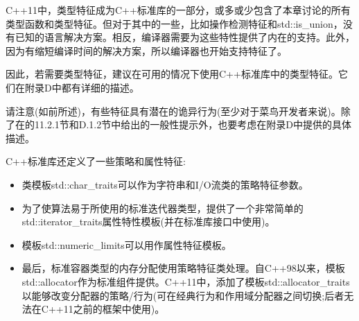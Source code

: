 C++11中，类型特征成为C++标准库的一部分，或多或少包含了本章讨论的所有类型函数和类型特征。但对于其中的一些，比如操作检测特征和std::is\_union，没有已知的语言解决方案。相反，编译器需要为这些特性提供了内在的支持。此外，因为有缩短编译时间的解决方案，所以编译器也开始支持特征了。

因此，若需要类型特征，建议在可用的情况下使用C++标准库中的类型特征。它们在附录D中都有详细的描述。

请注意(如前所述)，有些特征具有潜在的诡异行为(至少对于菜鸟开发者来说)。除了在的11.2.1节和D.1.2节中给出的一般性提示外，也要考虑在附录D中提供的具体描述。

C++标准库还定义了一些策略和属性特征:

\begin{itemize}
\item 
类模板std::char\_traits可以作为字符串和I/O流类的策略特征参数。

\item 
为了使算法易于所使用的标准迭代器类型，提供了一个非常简单的std::iterator\_traits属性特性模板(并在标准库接口中使用)。

\item 
模板std::numeric\_limits可以用作属性特征模板。

\item 
最后，标准容器类型的内存分配使用策略特征类处理。自C++98以来，模板std::allocator作为标准组件提供。C++11中，添加了模板std::allocator\_traits以能够改变分配器的策略/行为(可在经典行为和作用域分配器之间切换;后者无法在C++11之前的框架中使用)。
\end{itemize}



































